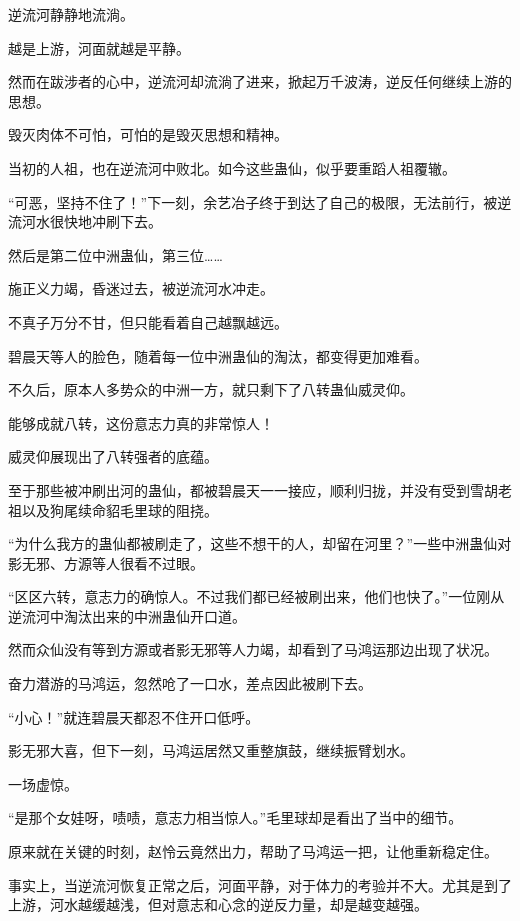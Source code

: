 
\begin{this_body}



逆流河静静地流淌。

越是上游，河面就越是平静。

然而在跋涉者的心中，逆流河却流淌了进来，掀起万千波涛，逆反任何继续上游的思想。

毁灭肉体不可怕，可怕的是毁灭思想和精神。

当初的人祖，也在逆流河中败北。如今这些蛊仙，似乎要重蹈人祖覆辙。

“可恶，坚持不住了！”下一刻，余艺冶子终于到达了自己的极限，无法前行，被逆流河水很快地冲刷下去。

然后是第二位中洲蛊仙，第三位……

施正义力竭，昏迷过去，被逆流河水冲走。

不真子万分不甘，但只能看着自己越飘越远。

碧晨天等人的脸色，随着每一位中洲蛊仙的淘汰，都变得更加难看。

不久后，原本人多势众的中洲一方，就只剩下了八转蛊仙威灵仰。

能够成就八转，这份意志力真的非常惊人！

威灵仰展现出了八转强者的底蕴。

至于那些被冲刷出河的蛊仙，都被碧晨天一一接应，顺利归拢，并没有受到雪胡老祖以及狗尾续命貂毛里球的阻挠。

“为什么我方的蛊仙都被刷走了，这些不想干的人，却留在河里？”一些中洲蛊仙对影无邪、方源等人很看不过眼。

“区区六转，意志力的确惊人。不过我们都已经被刷出来，他们也快了。”一位刚从逆流河中淘汰出来的中洲蛊仙开口道。

然而众仙没有等到方源或者影无邪等人力竭，却看到了马鸿运那边出现了状况。

奋力潜游的马鸿运，忽然呛了一口水，差点因此被刷下去。

“小心！”就连碧晨天都忍不住开口低呼。

影无邪大喜，但下一刻，马鸿运居然又重整旗鼓，继续振臂划水。

一场虚惊。

“是那个女娃呀，啧啧，意志力相当惊人。”毛里球却是看出了当中的细节。

原来就在关键的时刻，赵怜云竟然出力，帮助了马鸿运一把，让他重新稳定住。

事实上，当逆流河恢复正常之后，河面平静，对于体力的考验并不大。尤其是到了上游，河水越缓越浅，但对意志和心念的逆反力量，却是越变越强。


\end{this_body}
